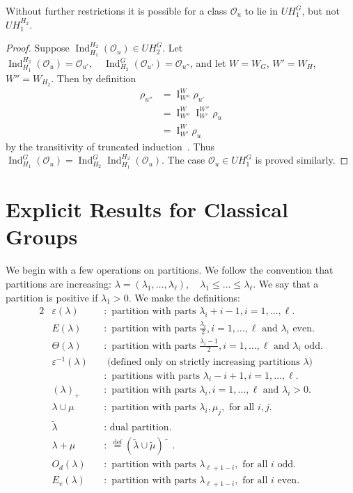 \documentclass{amsart}
\newenvironment{cthm}[1]
  {\renewcommand\thethm{\sc #1}\thm}
  {\endthm}
\newcommand\eps	{\varepsilon}
\newcommand\I		{\operatorname{I}}
\newcommand\Ind	{\operatorname{Ind}}
\newcommand\IndHH	{\Ind_{H_1}^{H_2}(\cO_u)}
\newcommand\lam	{\lambda}
\newcommand\lams	{(\lam_1,\dots,\lam_\ell)}
\newcommand\lamtil	{\tilde\lambda}
\newcommand\mutil	{\tilde\mu}
\newcommand\cO		{{\mathcal O}}
\newcommand\rhou	{\rho_u}
\begin{document}
\begin{cthm}{Remark} Without further restrictions it is possible for a
     class $\cO_u$ to lie in $UH_1^G$, but not $UH_1^{H_2}$.
     \end{cthm}

\begin{proof} Suppose $\IndHH \in UH_2^G$. Let 
$\IndHH = \cO_{u'}, \quad \Ind_{H_2}^G(\cO_{u'}) = \cO_{u''}$,
and let $W = W_G$, $W' = W_H$, $W'' = W_{H_2}$. Then by
definition
     \begin{align*}
     \rho_{u''} &= \I_{W''}^W \rho_{u'} \\
     &= \I_{W''}^W \I_{W'}^{W''} \rhou \\
     &= \I_{W'}^W \rhou
     \end{align*}
by the transitivity of truncated induction~\cite{C}.  Thus
$\Ind_{H_1}^G(\cO_u) = \Ind_{H_2}^G \IndHH$.  The case $\cO_u \in
UH_1^G$
is proved similarly.
\end{proof}


\section{Explicit Results for Classical Groups} %
\newcommand\sptilde{} %
\bigskip

We begin with a
few operations on partitions.  We follow the convention that partitions
are increasing: $\lam = \lams, \quad \lam_1 \le \dots \le \lam_\ell$.  We say
that a partition is positive if $\lam_1 > 0$.  We make the definitions:
	\begin{alignat*}{2}
	&\eps(\lam) 
		&&: \text{ partition with parts } \lam_i + i-1, i=1,\dots,\ell. \\
	&E(\lam)
		&&: \text{ partition with parts } \frac{\lam_i}2 , 
		i=1,\dots,\ell \text{ and } \lam_i \text{ even.} \\
	&\Theta(\lam)
		&&: \text{ partition with parts } \frac{\lam_i -1}2,
		i=1,\dots,\ell \text{ and } \lam_i \text{ odd.} \\
	&\eps^{-1}(\lam)
		&& \text{ (defined only on strictly increasing partitions }
		\lam) \\
	&
		&&: \text{ partitions with parts } \lam_i - i+1,
		i=1,\dots,\ell. \\
	&(\lam)_+
		&&: \text{ partition with parts } \lam_i, 
		i=1,\dots,\ell \text{ and } \lam_i > 0. \\
	&\lam \cup \mu
		&&: \text{ partition with parts } \lam_i, \mu_j,
		\text{ for all } i,j. \\
	&\lamtil
		&&: \text{ dual partition.} \\
	&\lam+\mu
		&&: \ \overset {\text{def}} %
                = (\lamtil \cup \mutil)\widetilde{\phantom{X}}\sptilde.\\
	&O_d(\lam)
		&&: \text{ partition with parts } \lambda_{\ell+1-i},
		\text{ for all } i \text{ odd.} \\
	&E_v(\lam)
		&&: \text{ partition with parts } \lambda_{\ell+1-i},
		\text{ for all } i \text{ even.}
	\end{alignat*}
\end{document}

